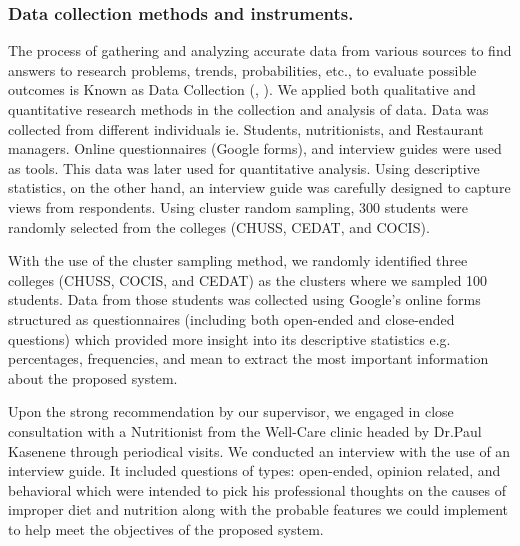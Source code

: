 \documentclass{article}
\begin{document}
\subsubsection{Data collection methods and instruments.}
The process of gathering and analyzing accurate data from various sources to find answers to research problems, trends, probabilities, etc., to evaluate possible outcomes is Known as Data Collection (\citeauthor{Simplelearn}, \citeyear{Simplelearn}). We applied both qualitative and quantitative research methods in the collection and analysis of data. Data was collected from different individuals ie. Students, nutritionists, and Restaurant managers. Online questionnaires (Google forms), and interview guides were used as tools. This data was later used for quantitative analysis.
Using descriptive statistics, on the other hand, an interview guide was carefully designed to capture views from respondents.
Using cluster random sampling, 300 students were randomly selected from the colleges (CHUSS, CEDAT, and COCIS).

\vspace{10pt}

\noindent With the use of the cluster sampling method, we randomly identified three colleges (CHUSS, COCIS, and CEDAT) as the clusters where we sampled 100 students. Data from those students was collected using Google's online forms structured as questionnaires (including both open-ended and close-ended questions) which provided more insight into its descriptive statistics e.g. percentages, frequencies, and mean to extract the most important information about the proposed system.
\vspace{10pt}

\noindent Upon the strong recommendation by our supervisor, we engaged in close consultation with a Nutritionist from the Well-Care clinic headed by Dr.Paul Kasenene through periodical visits.
We conducted an interview with the use of an interview guide. It included questions of types:  open-ended, opinion related, and behavioral which were intended to pick his professional thoughts on the causes of improper diet and nutrition along with the probable features we could implement to help meet the objectives of the proposed system.

\vspace{10pt}
\end{document}
